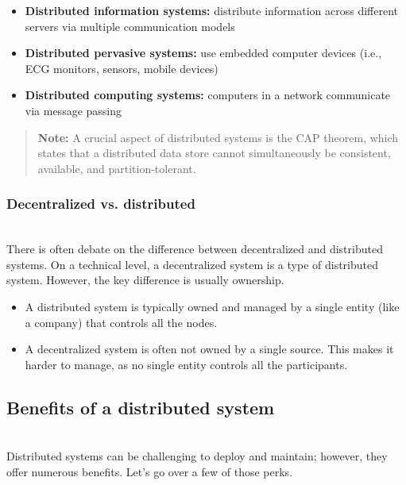 \begin{itemize}
\item
\protect{}\label{MOOCAeHh8d8RzzU_FawSy}
\textbf{Distributed information systems:} distribute information across different servers via multiple communication models
\item
\protect{}\label{U-Zl9iEArH9R7MCa_bhQM}
\textbf{Distributed pervasive systems:} use embedded computer devices (i.e., ECG monitors, sensors, mobile devices)
\item
\protect{}\label{es-CqSHo9X4_jnHTSW9Vv}
\textbf{Distributed computing systems:} computers in a network communicate via message passing
\end{itemize}
\begin{quote}
\textbf{Note:} A crucial aspect of distributed systems is the CAP theorem, which states that a distributed data store cannot simultaneously be consistent, available, and partition-tolerant.
\end{quote}
\subsubsection{Decentralized vs. distributed}\label{eg77giZhlJtu0ThKdw65k}
\\
There is often debate on the difference between decentralized and distributed systems. On a technical level, a decentralized system is a type of distributed system. However, the key difference is usually ownership.

\begin{itemize}
\item
\protect{}\label{UkJqthH-a0AhtsLWX802f}
A distributed system is typically owned and managed by a single entity (like a company) that controls all the nodes.
\item
\protect{}\label{Tabk5LnxMnCUoBILNinaG}
A decentralized system is often not owned by a single source. This makes it harder to manage, as no single entity controls all the participants.
\end{itemize}

\subsection{Benefits of a distributed system}\label{sV4C5vRBqhS2-XF74olzk}
\\
Distributed systems can be challenging to deploy and maintain; however, they offer numerous benefits. Let's go over a few of those perks.

